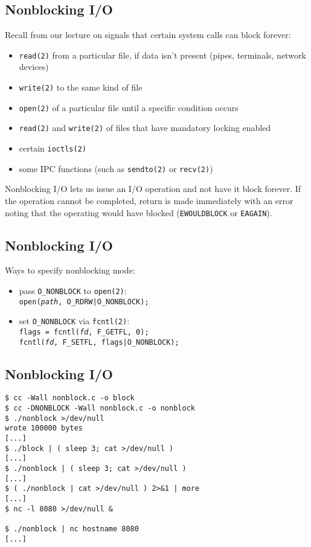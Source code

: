\documentclass[xga]{xdvislides}
\begin{document}
\subsection{Nonblocking I/O}
Recall from our lecture on signals that certain system calls can block forever:
\begin{itemize}
	\item {\tt read(2)} from a particular file, if data isn't present (pipes,
		terminals, network devices)
	\item {\tt write(2)} to the same kind of file
	\item {\tt open(2)} of a particular file until a specific condition occurs
	\item {\tt read(2)} and {\tt write(2)} of files that have mandatory
		locking enabled
	\item certain {\tt ioctls(2)}
	\item some IPC functions (such as {\tt sendto(2)} or {\tt recv(2)})
\end{itemize}
\vspace{.25in}
Nonblocking I/O lets us issue an I/O operation and not have it block forever.
If the operation cannot be completed, return is made immediately with an error
noting that the operating would have blocked ({\tt EWOULDBLOCK} or {\tt EAGAIN}).

\subsection{Nonblocking I/O}
Ways to specify nonblocking mode:
\begin{itemize}
	\item pass {\tt O\_NONBLOCK} to {\tt open(2)}: \\

		{\tt open({\em path}, O\_RDRW|O\_NONBLOCK);}
		\vspace{.2in}
	\item set {\tt O\_NONBLOCK} via {\tt fcntl(2)}: \\

		{\tt flags = fcntl({\em fd}, F\_GETFL, 0); \\
		     fcntl({\em fd}, F\_SETFL, flags|O\_NONBLOCK);}
\end{itemize}

\subsection{Nonblocking I/O}
\begin{verbatim}
$ cc -Wall nonblock.c -o block
$ cc -DNONBLOCK -Wall nonblock.c -o nonblock
$ ./nonblock >/dev/null
wrote 100000 bytes
[...]
$ ./block | ( sleep 3; cat >/dev/null )
[...]
$ ./nonblock | ( sleep 3; cat >/dev/null )
[...]
$ ( ./nonblock | cat >/dev/null ) 2>&1 | more
[...]
$ nc -l 8080 >/dev/null &

$ ./nonblock | nc hostname 8080
[...]
\end{verbatim}
\end{document}
